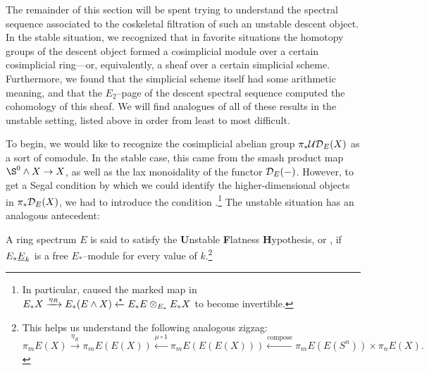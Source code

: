 The remainder of this section will be spent trying to understand the spectral sequence associated to the coskeletal filtration of such an unstable descent object.  In the stable situation, we recognized that in favorite situations the homotopy groups of the descent object formed a cosimplicial module over a certain cosimplicial ring---or, equivalently, a sheaf over a certain simplicial scheme.  Furthermore, we found that the simplicial scheme itself had some arithmetic meaning, and that the $E_2$--page of the descent spectral sequence computed the cohomology of this sheaf.  We will find analogues of all of these results in the unstable setting, listed above in order from least to most difficult.

To begin, we would like to recognize the cosimplicial abelian group $\pi_* \mathcal{UD}_E(X)$ as a sort of comodule.  In the stable case, this came from the smash product map $\S^0 \sm X \to X$, as well as the lax monoidality of the functor $\mathcal{D}_E(-)$.  However, to get a Segal condition by which we could identify the higher-dimensional objects in $\pi_* \mathcal{D}_E(X)$, we had to introduce the condition {\FH}.\footnote{In particular, {\FH} caused the marked map in $E_* X \xrightarrow{\eta_R} E_*(E \wedge X) \xleftarrow{\star} E_* E \otimes_{E_*} E_* X$ to become invertible.}  The unstable situation has an analogous antecedent:

\begin{definition}
A ring spectrum $E$ is said to satisfy the \textbf{U}nstable \textbf{F}latness \textbf{H}ypothesis, or \UFH, if $E_* \underline{\smash{E}}_{k}$ is a free $E_*$--module for every value of $k$.\footnote{This helps us understand the following analogous zigzag: \[\pi_m E(X) \xrightarrow{\eta_R} \pi_m E(E(X)) \xleftarrow{\mu \circ 1} \pi_m E(E(E(X))) \xleftarrow{\mathrm{compose}} \pi_m E(E(S^n)) \times \pi_n E(X).\]}
\end{definition}

